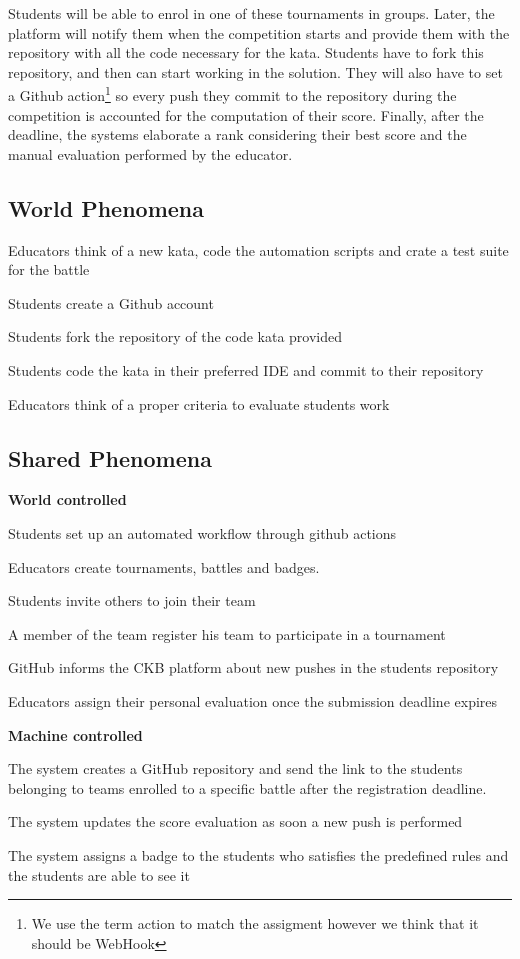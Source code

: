 Students will be able to enrol in one of these tournaments in groups. Later, the platform will notify them when the competition starts and provide them with the repository with all the code necessary for the kata. Students have to fork this repository, and then can start working in the solution. They will also have to set a Github action\footnote{We use the term action to match the assigment however we think that it should be WebHook} so every push they commit to the repository during the competition is accounted for the computation of their score. Finally, after the deadline, the systems elaborate a rank considering their best score and the manual evaluation performed by the educator.
\subsection{World Phenomena}


\begin{enumerate}[label={[WP\arabic*]}]
    \item Educators think of a new kata, code the automation  scripts and crate a test suite for the battle
    \item Students create a Github account
    \item Students fork the repository of the code kata provided

    \item Students code the kata in their preferred IDE and commit to their repository
    \item Educators think of a proper criteria to evaluate students work
\end{enumerate}
\subsection{Shared Phenomena}
 \textbf{World controlled}
\begin{enumerate}[label={[SP\arabic*]}]
    \item Students set up an automated workflow through github actions
    \item Educators create tournaments, battles and badges. 
    \item Students invite others to join their team
    \item A member of the team register his team to participate in a tournament
    \item GitHub informs the CKB platform about new pushes in the students repository
    \item Educators assign their personal evaluation once the submission deadline expires
    
 \textbf{Machine controlled}

  \item The system creates a GitHub repository and send the link to the students belonging to teams enrolled to a specific battle after the registration deadline.
  \item The system updates the score evaluation as soon a new push is performed
  \item The system assigns a badge to the students who satisfies the predefined rules and the students are able to see it
\end{enumerate}

